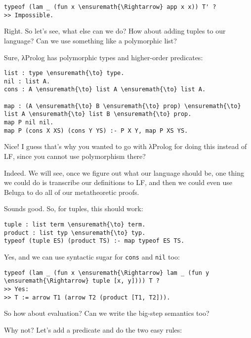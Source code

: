 \begin{verbatim}
typeof (lam _ (fun x \ensuremath{\Rightarrow} app x x)) T' ?
>> Impossible.
\end{verbatim}

\heroSTUDENT{} Right. So let's see, what else can we do? How about adding
tuples to our language? Can we use something like a polymorphic list?

\heroADVISOR{} Sure, \foreignlanguage{greek}{λ}Prolog has polymorphic types and higher-order
predicates:

\begin{verbatim}
list : type \ensuremath{\to} type.
nil : list A.
cons : A \ensuremath{\to} list A \ensuremath{\to} list A.

map : (A \ensuremath{\to} B \ensuremath{\to} prop) \ensuremath{\to} list A \ensuremath{\to} list B \ensuremath{\to} prop.
map P nil nil.
map P (cons X XS) (cons Y YS) :- P X Y, map P XS YS.
\end{verbatim}

\heroSTUDENT{} Nice! I guess that's why you wanted to go with \foreignlanguage{greek}{λ}Prolog for
doing this instead of LF, since you cannot use polymorphism there?

\heroADVISOR{} Indeed. We will see, once we figure out what our language
should be, one thing we could do is transcribe our definitions to LF,
and then we could even use Beluga \citep{pientka2010beluga} to do all of
our metatheoretic proofs.

\heroSTUDENT{} Sounds good. So, for tuples, this should work:

\begin{verbatim}
tuple : list term \ensuremath{\to} term.
product : list typ \ensuremath{\to} typ.
typeof (tuple ES) (product TS) :- map typeof ES TS.
\end{verbatim}

\heroADVISOR{} Yes, and we can use syntactic sugar for \texttt{cons} and
\texttt{nil} too:

\begin{verbatim}
typeof (lam _ (fun x \ensuremath{\Rightarrow} lam _ (fun y \ensuremath{\Rightarrow} tuple [x, y]))) T ?
>> Yes:
>> T := arrow T1 (arrow T2 (product [T1, T2])).
\end{verbatim}

\heroSTUDENT{} So how about evaluation? Can we write the big-step semantics
too?

\heroADVISOR{} Why not? Let's add a predicate and do the two easy rules:

